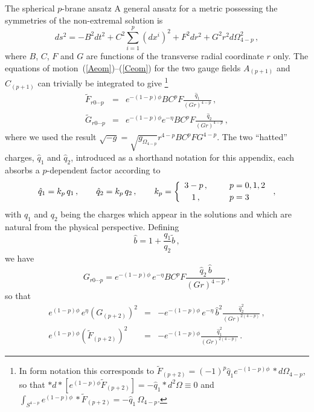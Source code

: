\documentclass[a4paper,11pt]{article}
\makeatletter
\renewcommand{\subsection}{\@startsection{subsection}{2}{\z@} {-3.25ex
plus -1ex minus -.2ex}{1.5ex plus .2ex}{\normalsize\bf}}
\newcommand{\qh}{\hat{q}} \newcommand{\hh}{\hat{h}}
\newcommand{\eqref}[1]{(\ref{#1})}
\makeatother
\begin{document}
\subsection{The spherical $p$-brane ansatz}
\label{subsect:spherical}
A general ansatz for a metric possessing the symmetries of the
non-extremal solution is
%
\begin{equation}
\label{genansatz}
ds^2 = - B^2 dt^2 + C^2 \sum_{i=1}^p (dx^i)^2 + F^2 dr^2 + G^2 r^2
d\Omega_{4-p}^2 \,,
\end{equation}
%
where $B$, $C$, $F$ and $G$ are functions of the transverse radial
coordinate $r$ only. The equations of motion~\eqref{Aeom}--\eqref{Ceom}
for the two gauge fields $A_{(p+1)}$ and $C_{(p+1)}$ can trivially be
integrated to give%
\footnote{In form notation this corresponds to $\tilde{F}_{(p+2)}
=(-1)^{p}\qh_1e^{-(1-p)\phi}\,{*}d\Omega_{4-p}$, so that
${*}d{*}[e^{(1-p)\phi}\tilde{F}_{(p+2)}]= -\qh_1{*}d^2\Omega\equiv0$
and  $\int_{S^{4-p}}e^{(1-p)\phi}\,{*}\tilde{F}_{(p+2)}=  -
\qh_1\,\Omega_{4-p}$.}
\begin{eqnarray}
\tilde{F}_{r 0 \cdots p} &=& e^{-(1-p)\phi} B C^p F
       \frac{\qh_1}{(Gr)^{4-p}}\,, \\[2ex] \tilde{G}_{r 0 \cdots p}
       &=& e^{-(1-p)\phi} e^{-\eta} B C^p F \frac{\qh_2}{(Gr)^{4-p}}
       \,,
\end{eqnarray}
%
where we used the result $\sqrt{-g} = \sqrt{g_{\Omega_{4-p}}} r^{4-p}
B C^p F G^{4-p}$. The two ``hatted'' charges, $\qh_1$ and $\qh_2$,
introduced as a  shorthand notation for this appendix, each absorbs a
$p$-dependent factor according to
\begin{equation}
\label{appcharges}
\qh_1 = k_p\,q_1 \spa \qh_2 = k_p\,q_2 \spa  k_p =
\left\{\begin{array}{cll} 3-p\,, &~~&p=0,1,2 \\[.5ex]  1\,, & & p=3
\end{array}\right. \,,
\end{equation}
with $q_1$ and $q_2$ being the charges which appear in the solutions
and which are natural from the physical perspective. Defining
%
\begin{equation}
\hat{b} = 1 + \frac{q_1}{q_2} \tilde{b} \,,
\end{equation}
%
we have
%
\begin{equation}
\label{Gspherical}
G_{r 0 \cdots p} = e^{-(1-p)\phi}\, e^{-\eta} B C^p F
\frac{\qh_2\,\hat{b}}{(Gr)^{4-p}} \,,
\end{equation}
%
so that
%
\begin{eqnarray}
e^{(1-p)\phi} \,e^\eta (G_{(p+2)})^2 &=& - e^{-(1-p)\phi}\,
e^{-\eta}\, \hat{b}^2 \frac{\qh_2^2}{(Gr)^{2(4-p)}} \,, \\[2ex]
%
e^{(1-p)\phi} (\tilde{F}_{(p+2)})^2 &=& - e^{-(1-p)\phi}
\frac{\qh_1^2}{(Gr)^{2(4-p)}} \,.
\end{eqnarray}
\end{document}

